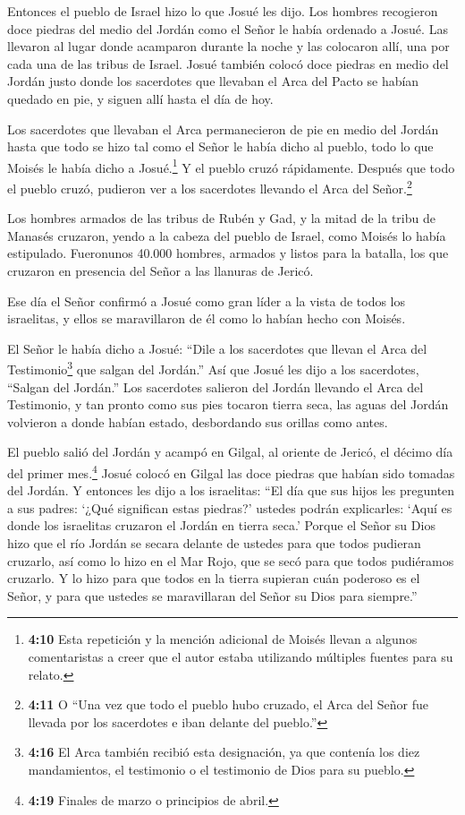  Entonces el pueblo de Israel hizo lo que Josué les dijo.
Los hombres recogieron doce piedras del medio del Jordán como el Señor
le había ordenado a Josué. Las llevaron al lugar donde acamparon durante
la noche y las colocaron allí, una por cada una de las tribus de Israel.
 Josué también colocó doce piedras en medio del Jordán justo
donde los sacerdotes que llevaban el Arca del Pacto se habían quedado en
pie, y siguen allí hasta el día de hoy.

 Los sacerdotes que llevaban el Arca permanecieron de pie
en medio del Jordán hasta que todo se hizo tal como el Señor le había
dicho al pueblo, todo lo que Moisés le había dicho a Josué.\footnote{\textbf{4:10}
  Esta repetición y la mención adicional de Moisés llevan a algunos
  comentaristas a creer que el autor estaba utilizando múltiples fuentes
  para su relato.} Y el pueblo cruzó rápidamente.  Después
que todo el pueblo cruzó, pudieron ver a los sacerdotes llevando el Arca
del Señor.\footnote{\textbf{4:11} O ``Una vez que todo el pueblo hubo
  cruzado, el Arca del Señor fue llevada por los sacerdotes e iban
  delante del pueblo.''}

 Los hombres armados de las tribus de Rubén y Gad, y la
mitad de la tribu de Manasés cruzaron, yendo a la cabeza del pueblo de
Israel, como Moisés lo había estipulado.  Fueronunos 40.000
hombres, armados y listos para la batalla, los que cruzaron en presencia
del Señor a las llanuras de Jericó.

 Ese día el Señor confirmó a Josué como gran líder a la
vista de todos los israelitas, y ellos se maravillaron de él como lo
habían hecho con Moisés.

 El Señor le había dicho a Josué:  ``Dile a
los sacerdotes que llevan el Arca del Testimonio\footnote{\textbf{4:16}
  El Arca también recibió esta designación, ya que contenía los diez
  mandamientos, el testimonio o el testimonio de Dios para su pueblo.}
que salgan del Jordán.''  Así que Josué les dijo a los
sacerdotes, ``Salgan del Jordán.''  Los sacerdotes salieron
del Jordán llevando el Arca del Testimonio, y tan pronto como sus pies
tocaron tierra seca, las aguas del Jordán volvieron a donde habían
estado, desbordando sus orillas como antes.

 El pueblo salió del Jordán y acampó en Gilgal, al oriente
de Jericó, el décimo día del primer mes.\footnote{\textbf{4:19} Finales
  de marzo o principios de abril.}  Josué colocó en Gilgal
las doce piedras que habían sido tomadas del Jordán.  Y
entonces les dijo a los israelitas: ``El día que sus hijos les pregunten
a sus padres: `¿Qué significan estas piedras?'  ustedes
podrán explicarles: `Aquí es donde los israelitas cruzaron el Jordán en
tierra seca.'  Porque el Señor su Dios hizo que el río
Jordán se secara delante de ustedes para que todos pudieran cruzarlo,
así como lo hizo en el Mar Rojo, que se secó para que todos pudiéramos
cruzarlo.  Y lo hizo para que todos en la tierra supieran
cuán poderoso es el Señor, y para que ustedes se maravillaran del Señor
su Dios para siempre.''

